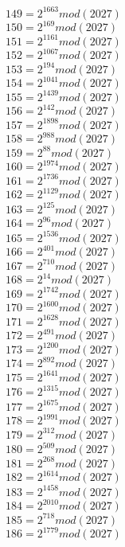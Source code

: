 \documentclass[12pt, letterpaper]{article}
\begin{document}
\begin{itemize}
\begin{multicols}{3}
$149= 2^{1663} mod (2027)$\\
$150= 2^{169} mod (2027)$\\
$151= 2^{1161} mod (2027)$\\
$152= 2^{1067} mod (2027)$\\
$153= 2^{194} mod (2027)$\\
$154= 2^{1041} mod (2027)$\\
$155= 2^{1439} mod (2027)$\\
$156= 2^{142} mod (2027)$\\
$157= 2^{1898} mod (2027)$\\
$158= 2^{988} mod (2027)$\\
$159= 2^{88} mod (2027)$\\
$160= 2^{1974} mod (2027)$\\
$161= 2^{1736} mod (2027)$\\
$162= 2^{1129} mod (2027)$\\
$163= 2^{125} mod (2027)$\\
$164= 2^{96} mod (2027)$\\
$165= 2^{1536} mod (2027)$\\
$166= 2^{401} mod (2027)$\\
$167= 2^{710} mod (2027)$\\
$168= 2^{14} mod (2027)$\\
$169= 2^{1742} mod (2027)$\\
$170= 2^{1600} mod (2027)$\\
$171= 2^{1628} mod (2027)$\\
$172= 2^{491} mod (2027)$\\
$173= 2^{1200} mod (2027)$\\
$174= 2^{892} mod (2027)$\\
$175= 2^{1641} mod (2027)$\\
$176= 2^{1315} mod (2027)$\\
$177= 2^{1675} mod (2027)$\\
$178= 2^{1991} mod (2027)$\\
$179= 2^{312} mod (2027)$\\
$180= 2^{509} mod (2027)$\\
$181= 2^{268} mod (2027)$\\
$182= 2^{1614} mod (2027)$\\
$183= 2^{1458} mod (2027)$\\
$184= 2^{2010} mod (2027)$\\
$185= 2^{718} mod (2027)$\\
$186= 2^{1779} mod (2027)$\\

\end{multicols}
\end{itemize}
\end{document}
